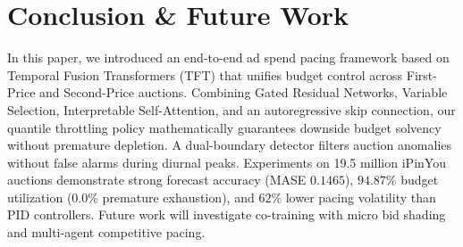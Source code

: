 \documentclass[sigconf]{acmart}
\begin{document}
\section{Conclusion \& Future Work}
In this paper, we introduced an end-to-end ad spend pacing framework based on Temporal Fusion Transformers (TFT) that unifies budget control across First-Price and Second-Price auctions. Combining Gated Residual Networks, Variable Selection, Interpretable Self-Attention, and an autoregressive skip connection, our quantile throttling policy mathematically guarantees downside budget solvency without premature depletion. A dual-boundary detector filters auction anomalies without false alarms during diurnal peaks. Experiments on 19.5 million iPinYou auctions demonstrate strong forecast accuracy (MASE $0.1465$), $94.87\%$ budget utilization ($0.0\%$ premature exhaustion), and $62\%$ lower pacing volatility than PID controllers. Future work will investigate co-training with micro bid shading and multi-agent competitive pacing.

\balance


\end{document}
